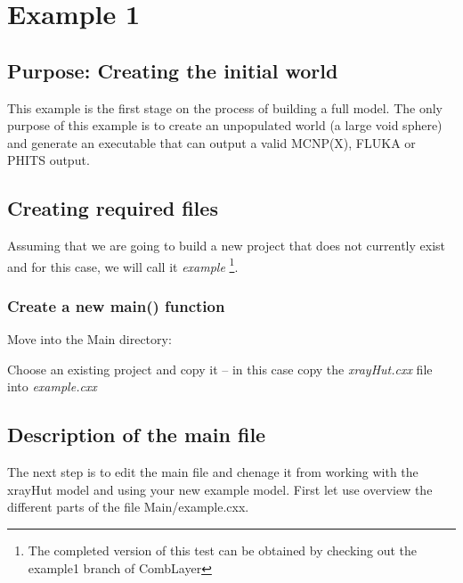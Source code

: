 
\section{Example 1}

\subsection{Purpose: Creating the initial world}

This example is the first stage on the process of building a full model.
The only purpose of this example is to create an unpopulated world (a large
void sphere) and generate an executable that can output a valid MCNP(X),
FLUKA or PHITS output.

\subsection{Creating required files}

Assuming that we are going to build a new project that does not
currently exist and for this case, we will call it {\it example}
\footnote{The completed version of this test can be obtained by
checking out the example1 branch of CombLayer}.

\subsubsection{Create a new main() function}

Move into the Main directory:

Choose an existing project and copy it  --  in this case
copy the {\it xrayHut.cxx} file into {\it example.cxx}

\subsection{Description of the main file}

The next step is to edit the main file and chenage it from working
with the xrayHut model and using your new example model. First let use
overview the different parts of the file Main/example.cxx. 

